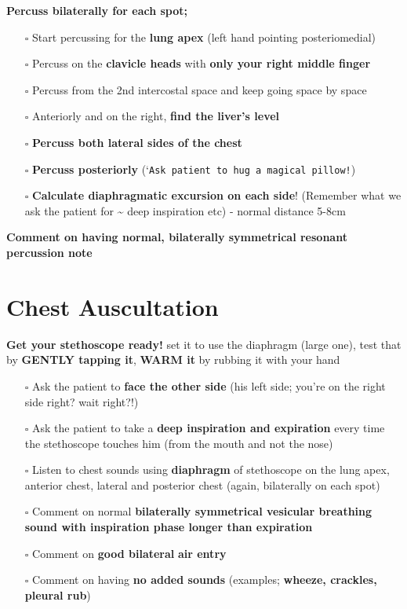 \documentclass[
  13.5pt,
  a4paper,
  DIV=11,
  numbers=noendperiod]{scrreprt}
\providecommand{\tightlist}{%
  \setlength{\itemsep}{0pt}\setlength{\parskip}{0pt}}
\begin{document}
\textbf{Percuss bilaterally for each spot;}

\begin{itemize}
\tightlist
\item[$\square$]
  Start percussing for the \textbf{lung apex} (left hand pointing
  posteriomedial)
\item[$\square$]
  Percuss on the \textbf{clavicle heads} with \textbf{only your right
  middle finger}
\item[$\square$]
  Percuss from the 2nd intercostal space and keep going space by space
\item[$\square$]
  Anteriorly and on the right, \textbf{find the liver's level}
\item[$\square$]
  \textbf{Percuss both lateral sides of the chest}
\item[$\square$]
  \textbf{Percuss posteriorly}
  (`\texttt{Ask\ patient\ to\ hug\ a\ magical\ pillow!})
\item[$\square$]
  \textbf{Calculate diaphragmatic excursion on each side}! (Remember
  what we ask the patient for \textasciitilde{} deep inspiration etc) -
  normal distance 5-8cm
\end{itemize}

\textbf{Comment on having normal, bilaterally symmetrical resonant
percussion note}

\section{Chest Auscultation}\label{chest-auscultation}

\textbf{Get your stethoscope ready!} set it to use the diaphragm (large
one), test that by \textbf{GENTLY tapping it}, \textbf{WARM it} by
rubbing it with your hand

\begin{itemize}
\tightlist
\item[$\square$]
  Ask the patient to \textbf{face the other side} (his left side; you're
  on the right side right? wait right?!)
\item[$\square$]
  Ask the patient to take a \textbf{deep inspiration and expiration}
  every time the stethoscope touches him (from the mouth and not the
  nose)
\item[$\square$]
  Listen to chest sounds using \textbf{diaphragm} of stethoscope on the
  lung apex, anterior chest, lateral and posterior chest (again,
  bilaterally on each spot)
\item[$\square$]
  Comment on normal \textbf{bilaterally symmetrical vesicular breathing
  sound with inspiration phase longer than expiration}
\item[$\square$]
  Comment on \textbf{good bilateral} \textbf{air entry}
\item[$\square$]
  Comment on having \textbf{no added sounds} (examples; \textbf{wheeze,
  crackles, pleural rub})
\end{itemize}
\end{document}
